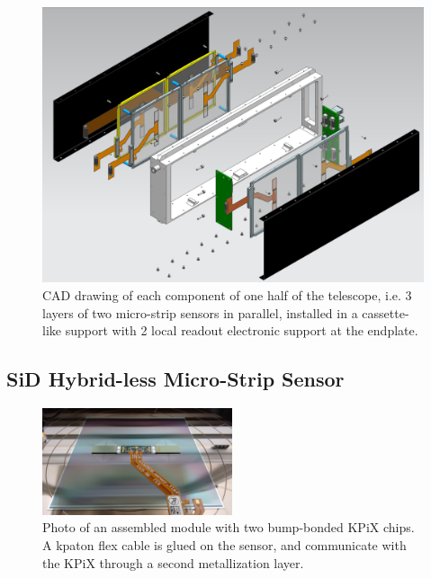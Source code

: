 \documentclass[conference]{IEEEtran}
\begin{document}
\begin{figure}[!t]
\centering
\includegraphics[width=0.8\linewidth]{pics/Explosion.png}
\caption{CAD drawing of each component of one half of the telescope,
i.e. 3 layers of two micro-strip sensors in parallel,
installed in a cassette-like support with 2 local readout electronic support at the endplate.}
\label{fig:intro1}
\end{figure}

\subsection{SiD Hybrid-less Micro-Strip Sensor}

\begin{figure}[!t]
\centering
\includegraphics[width=2.2in]{pics/sensor_module1.jpg}
\caption{Photo of an assembled module with two bump-bonded KPiX chips.
A kpaton flex cable is glued on the sensor,
and communicate with the KPiX through a second metallization layer.}
\label{fig:sensor}
\end{figure}
\end{document}
